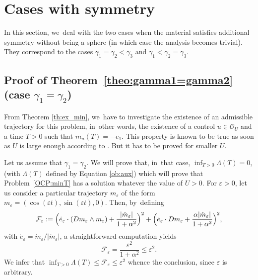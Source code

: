 \documentclass[10pt]{amsart}
\theoremstyle{definition}
\begin{document}
\section{Cases with symmetry}\label{sec:ProofSym}

In this section, we~deal with the two cases when the material satisfies additional symmetry without being a sphere (in which case the analysis becomes trivial). They correspond to the cases $\gamma_1 = \gamma_2 < \gamma_3$ and $\gamma_1 < \gamma_2 = \gamma_3$.

\subsection{Proof of Theorem~\ref{theo:gamma1=gamma2} (case \texorpdfstring{$\gamma_1=\gamma_2$}{gamma1=gamma2})}

From Theorem \ref{th:ex_min}, we~have to investigate the existence of an admissible trajectory for this problem, in~other words, the existence of a control $u\in \mathcal{O}_U$ and a time $T>0$ such that $m_u(T)=-e_1$. This property is known to be true as soon as $U $ is large enough according to \cite{alouges2009magnetization}. But it has to be proved for smaller $U $.

Let us assume that $\gamma_1=\gamma_2$.
We will prove that, in~that case, $\inf_{T>0}\Lambda(T)=0$, (with $\Lambda(T)$ defined by Equation \eqref{ob:aux}) which will prove that Problem~\eqref{OCP:minT} has a solution whatever the value of $U >0$. For $\varepsilon>0$, let us consider a particular trajectory $m_\varepsilon$ of the form $m_\varepsilon=(\cos (\varepsilon t),\sin(\varepsilon t),0)$. Then, by~defining
\[
\mathcal F_\varepsilon: = \Bigl(\dot e_\varepsilon\cdot (Dm_\varepsilon\wedge m_\varepsilon)+\frac{|\dot m_\varepsilon|}{1+\alpha^2}\Bigr)^2+\Bigl(\dot e_\varepsilon\cdot Dm_\varepsilon+\frac{\alpha|\dot m_\varepsilon|}{1+\alpha^2}\Bigr)^2,
\]
with $\dot e_\varepsilon=\dot m_\varepsilon/|\dot m_\varepsilon|$, a straightforward computation yields
\[
\mathcal F_\varepsilon=\frac{\varepsilon^2}{1+\alpha^2}\leq \varepsilon^2.
\]
We infer that $\inf_{T>0}\Lambda(T)\leq \mathcal F_\varepsilon\leq \varepsilon^2$ whence the conclusion, since $\varepsilon$ is arbitrary.
\end{document}
